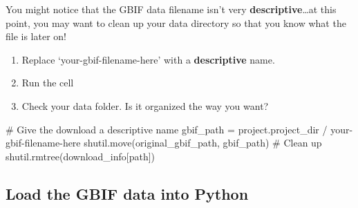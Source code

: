 \documentclass[
  letterpaper,
  DIV=11,
  numbers=noendperiod,
  oneside]{scrreprt}
\newenvironment{Shaded}{\begin{snugshade}}{\end{snugshade}}
\newcommand{\CommentTok}[1]{\textcolor[rgb]{0.37,0.37,0.37}{#1}}
\newcommand{\NormalTok}[1]{\textcolor[rgb]{0.00,0.23,0.31}{#1}}
\newcommand{\OperatorTok}[1]{\textcolor[rgb]{0.37,0.37,0.37}{#1}}
\newcommand{\StringTok}[1]{\textcolor[rgb]{0.13,0.47,0.30}{#1}}
\providecommand{\tightlist}{%
  \setlength{\itemsep}{0pt}\setlength{\parskip}{0pt}}
\begin{document}
You might notice that the GBIF data filename isn't very
\textbf{descriptive}\ldots at this point, you may want to clean up your
data directory so that you know what the file is later on!

\begin{tcolorbox}[enhanced jigsaw, colbacktitle=quarto-callout-color!10!white, opacityback=0, bottomtitle=1mm, toptitle=1mm, bottomrule=.15mm, left=2mm, colframe=quarto-callout-color-frame, leftrule=.75mm, opacitybacktitle=0.6, colback=white, rightrule=.15mm, toprule=.15mm, breakable, titlerule=0mm, title=\textcolor{quarto-callout-color}{\faInfo}\hspace{0.5em}{Try It}, coltitle=black, arc=.35mm]

\begin{enumerate}
\def\labelenumi{\arabic{enumi}.}
\tightlist
\item
  Replace `your-gbif-filename-here' with a \textbf{descriptive} name.
\item
  Run the cell
\item
  Check your data folder. Is it organized the way you want?
\end{enumerate}

\end{tcolorbox}

\begin{Shaded}
\begin{Highlighting}[]
\CommentTok{\# Give the download a descriptive name}
\NormalTok{gbif\_path }\OperatorTok{=}\NormalTok{ project.project\_dir }\OperatorTok{/} \StringTok{\textquotesingle{}your{-}gbif{-}filename{-}here\textquotesingle{}}
\NormalTok{shutil.move(original\_gbif\_path, gbif\_path)}
\CommentTok{\# Clean up}
\NormalTok{shutil.rmtree(download\_info[}\StringTok{\textquotesingle{}path\textquotesingle{}}\NormalTok{])}
\end{Highlighting}
\end{Shaded}

\subsection{Load the GBIF data into
Python}\label{load-the-gbif-data-into-python}
\end{document}
